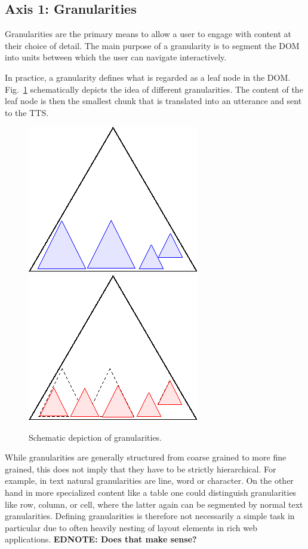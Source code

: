 \documentclass{sig-alternate}
\newcommand\ednote[1]{\typeout{There is still a note!!!}%
  {\bf EDNOTE: #1}}
\begin{document}
\subsection{Axis 1: Granularities}
\label{sec:ax1}

Granularities are the primary means to allow a user to engage with content at
their choice of detail. The main purpose of a granularity is to segment the DOM
into units between which the user can navigate interactively.

In practice, a granularity defines what is regarded as a leaf node in the
DOM. Fig.~\ref{fig:granularity} schematically depicts the idea of different
granularities. The content of the leaf node is then the smallest chunk that is
translated into an utterance and sent to the TTS.

\begin{figure}[ht!]
  \begin{center}
    \leavevmode
    \includegraphics[width=.4\columnwidth]{images/granularity1}
    \includegraphics[width=.4\columnwidth]{images/granularity2}
    \caption{Schematic depiction of granularities.}
    \label{fig:granularity}
  \end{center}
\end{figure}

While granularities are generally structured from coarse grained to more fine
grained, this does not imply that they have to be strictly hierarchical. For
example, in text natural granularities are line, word or character. On the other
hand in more specialized content like a table one could distinguish
granularities like row, column, or cell, where the latter again can be segmented
by normal text granularities.  Defining granularities is therefore not
necessarily a simple task in particular due to often heavily nesting of layout
elements in rich web applications.\ednote{Does that make sense?}
\end{document}
